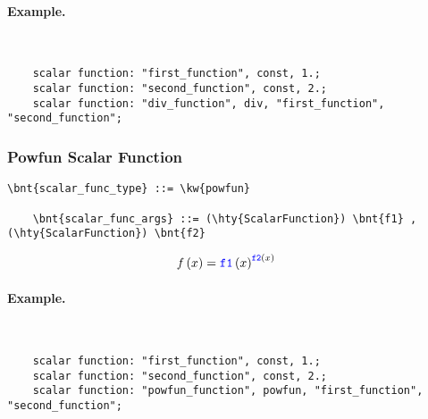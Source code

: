 \paragraph{Example.} \
\begin{verbatim}
    scalar function: "first_function", const, 1.;
    scalar function: "second_function", const, 2.;
    scalar function: "div_function", div, "first_function", "second_function";
\end{verbatim}

\subsubsection{Powfun Scalar Function}
\begin{Verbatim}[commandchars=\\\{\}]
    \bnt{scalar_func_type} ::= \kw{powfun}

    \bnt{scalar_func_args} ::= (\hty{ScalarFunction}) \bnt{f1} , (\hty{ScalarFunction}) \bnt{f2}
\end{Verbatim}
\begin{align}
	f\left( x \right)
	&=
	\textcolor{blue}{\texttt{f1}}\left( x \right) ^{ \textcolor{blue}{\texttt{f2}}\left( x \right) }
\end{align}

\paragraph{Example.} \
\begin{verbatim}
    scalar function: "first_function", const, 1.;
    scalar function: "second_function", const, 2.;
    scalar function: "powfun_function", powfun, "first_function", "second_function";
\end{verbatim}



